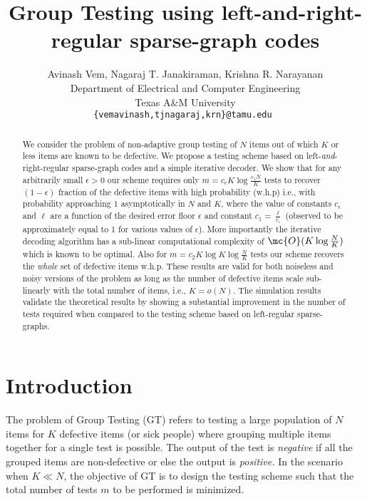 \documentclass[conference,twocolumn]{IEEEtran}
\def\ceps{c_{\epsilon}}
\begin{document}
\title{Group Testing using left-and-right-regular sparse-graph codes}
\author{Avinash Vem, Nagaraj T. Janakiraman, Krishna R. Narayanan\\
Department of Electrical and Computer Engineering \\
Texas A\&M University\\
{\tt\small {\{vemavinash,tjnagaraj,krn\}@tamu.edu} }}

\maketitle
\begin{abstract}
We consider the problem of non-adaptive group testing of $N$ items out of which $K$ or less items are known to be defective. We propose a testing scheme based on left-{\em and}-right-regular sparse-graph codes and a simple iterative decoder. We show that for any arbitrarily small $\epsilon>0$ our scheme requires only $m=\ceps K\log \frac{c_1N}{K}$ tests to recover $(1-\epsilon)$ fraction of the defective items with high probability (w.h.p) i.e., with probability approaching $1$ asymptotically in $N$ and $K$, where the value of constants $\ceps$ and $\ell$ are a function of the desired error floor $\epsilon$ and constant $c_1=\frac{\ell}{\ceps}$ (observed to be approximately equal to 1 for various values of $\epsilon$). More importantly the iterative decoding algorithm has a sub-linear computational complexity of $\mc{O}(K\log \frac{N}{K})$ which is known to be optimal. Also for $m=c_2 K\log K\log \frac{N}{K}$ tests our scheme recovers the \textit{whole} set of defective items w.h.p. These results are valid for both noiseless and noisy versions of the problem as long as the number of defective items scale sub-linearly with the total number of items, i.e., $K=o(N)$. The simulation results validate the theoretical results by showing a substantial improvement in the number of tests required when compared to the testing scheme based on left-regular sparse-graphs.
\end{abstract}

\section{Introduction}
The problem of Group Testing (GT) refers to testing a large population of $N$ items for $K$ defective items (or sick people) where grouping multiple items together for a single test is possible. The output of the test is \textit{negative} if all the grouped items are non-defective or else the output is \textit{positive.} In the scenario when $K \ll N$, the objective of GT is to design the testing scheme such that the total number of tests $m$ to be performed is minimized.
\end{document}

